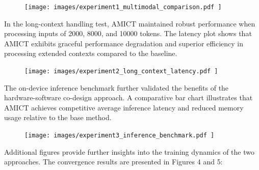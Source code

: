 \documentclass{article} %
\begin{document}
\begin{figure}[H]
  \centering
  \texttt{[image:  images/experiment1\_multimodal\_comparison.pdf ]}
\end{figure}

In the long-context handling test, AMICT maintained robust performance when processing inputs of 2000, 8000, and 10000 tokens. The latency plot shows that AMICT exhibits graceful performance degradation and superior efficiency in processing extended contexts compared to the baseline.

\begin{figure}[H]
  \centering
  \texttt{[image:  images/experiment2\_long\_context\_latency.pdf ]}
\end{figure}

The on-device inference benchmark further validated the benefits of the hardware-software co-design approach. A comparative bar chart illustrates that AMICT achieves competitive average inference latency and reduced memory usage relative to the base method.

\begin{figure}[H]
  \centering
  \texttt{[image:  images/experiment3\_inference\_benchmark.pdf ]}
\end{figure}

Additional figures provide further insights into the training dynamics of the two approaches. The convergence results are presented in Figures 4 and 5:
\end{document}
